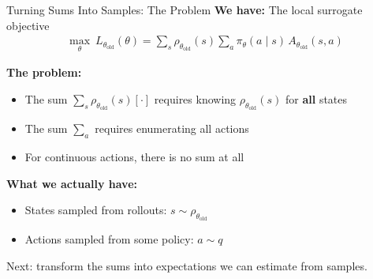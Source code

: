 \documentclass[aspectratio=169]{beamer}
\newcommand{\told}{\theta_{\mathrm{old}}}
\begin{document}
\begin{frame}[label=sampling-details-1]{Turning Sums Into Samples: The Problem}
  \textbf{We have:} The local surrogate objective
  \begin{gather*}
    \max_\theta\ L_{\told}(\theta) = \sum_s \rho_{\told}(s) \sum_a \pi_\theta(a\mid s)\, A_{\told}(s,a)
  \end{gather*}

  \vspace{12pt}
  \textbf{The problem:}
  \begin{itemize}
    \item The sum $\sum_s \rho_{\told}(s)[\cdot]$ requires knowing $\rho_{\told}(s)$ for \textbf{all} states
    \item The sum $\sum_a$ requires enumerating all actions
    \item For continuous actions, there is no sum at all
  \end{itemize}

  \vspace{12pt}
  \textbf{What we actually have:}
  \begin{itemize}
    \item States sampled from rollouts: $s \sim \rho_{\told}$
    \item Actions sampled from some policy: $a \sim q$
  \end{itemize}

  \vspace{8pt}
  \begin{noteframe}
    \small Next: transform the sums into expectations we can estimate from samples.
  \end{noteframe}

  \vspace{8pt}
  \centering

\end{frame}
\end{document}

